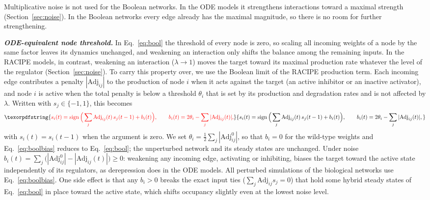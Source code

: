 \documentclass[11pt]{article}
\newcommand{\adj}{\mathrm{Adj}}
\providecommand{\DIFaddtex}[1]{{\protect\color{red}#1}} %
\providecommand{\DIFdeltex}[1]{} %
\providecommand{\DIFaddbegin}{} %
\providecommand{\DIFaddend}{} %
\providecommand{\DIFdelbegin}{} %
\providecommand{\DIFdelend}{} %
\providecommand{\DIFadd}[1]{\texorpdfstring{\DIFaddtex{#1}}{#1}} %
\providecommand{\DIFdel}[1]{\texorpdfstring{\DIFdeltex{#1}}{}} %
\providecommand{\DIFaddincludegraphics}[2][]{\DIFOincludegraphics[#1]{#2}} %
\providecommand{\DIFdelincludegraphics}[2][]{}
\DeclareRobustCommand{\DIFaddbegin}{\DIFOaddbegin \let\includegraphics\DIFaddincludegraphics} %
\DeclareRobustCommand{\DIFaddend}{\DIFOaddend \let\includegraphics\DIFOincludegraphics} %
\DeclareRobustCommand{\DIFdelbegin}{\DIFOdelbegin \let\includegraphics\DIFdelincludegraphics} %
\DeclareRobustCommand{\DIFdelend}{\DIFOaddend \let\includegraphics\DIFOincludegraphics} %
\begin{document}
\DIFdelbegin \DIFdel{At each time step, each edge weight is scaled by a factor drawn from $\mathcal{N}(1, \sigma^2)$, so that the magnitude of the perturbation scales with the current edge weight:
}%
\DIFdelend \DIFaddbegin \DIFadd{Multiplicative noise is not used for the Boolean networks. In the ODE models it strengthens interactions toward a maximal strength (Section~\ref{sec:noise}). In the Boolean networks every edge already has the maximal magnitude, so there is no room for further strengthening.
}\DIFaddend 

\DIFdelbegin \DIFdel{At each time step, each edge weight is redrawn as its wild-type value plus an independent perturbation, so that the weight fluctuates around its nominal value without drift: }%
\DIFdelend \DIFaddbegin \noindent\textbf{\textit{\DIFadd{ODE-equivalent node threshold.}}} \DIFadd{In Eq.~\ref{eq:bool} the threshold of every node is zero, so scaling all incoming weights of a node by the same factor leaves its dynamics unchanged, and weakening an interaction only shifts the balance among the remaining inputs. In the RACIPE models, in contrast, weakening an interaction ($\lambda \to 1$) moves the target toward its maximal production rate whatever the level of the regulator (Section~\ref{sec:noise}). To carry this property over, we use the Boolean limit of the RACIPE production term. Each incoming edge contributes a penalty $|\adj_{ij}|$ to the production of node $i$ when it acts against the target (an active inhibitor or an inactive activator), and node $i$ is active when the total penalty is below a threshold $\theta_i$ that is set by its production and degradation rates and is not affected by $\lambda$. Written with $s_j \in \{-1,1\}$, this becomes
}\begin{equation} \DIFadd{\label{eq:boolbias}
    s_i(t) = \operatorname{sign}\Big(\sum_j \adj_{ij}(t)\, s_j(t-1) + b_i(t)\Big), \qquad b_i(t) = 2\theta_i - \sum_j |\adj_{ij}(t)|,
}\end{equation}\DIFaddend 
\DIFdelbegin \DIFdel{where $\mathrm{EW}_0$ denotes the wild-type edgeweight. Unlike the additive mode, this formulation prevents long-range drift in parameter values and modelsa situation where molecular fluctuations are transient and the nominal interaction strength is effectively restored between perturbation events.}\DIFdelend \DIFaddbegin \DIFadd{with $s_i(t) = s_i(t-1)$ when the argument is zero. We set $\theta_i = \tfrac12\sum_j |\adj^{0}_{ij}|$, so that $b_i = 0$ for the wild-type weights and Eq.~\ref{eq:boolbias} reduces to Eq.~\ref{eq:bool}; the unperturbed network and its steady states are unchanged. Under noise $b_i(t) = \sum_j \big(|\adj^{0}_{ij}| - |\adj_{ij}(t)|\big) \ge 0$: weakening any incoming edge, activating or inhibiting, biases the target toward the active state independently of its regulators, as derepression does in the ODE models. All perturbed simulations of the biological networks use Eq.~\ref{eq:boolbias}. One side effect is that any $b_i > 0$ breaks the exact input ties ($\sum_j \adj_{ij} s_j = 0$) that hold some hybrid steady states of Eq.~\ref{eq:bool} in place toward the active state, which shifts occupancy slightly even at the lowest noise level.
}\DIFaddend 
\end{document}
